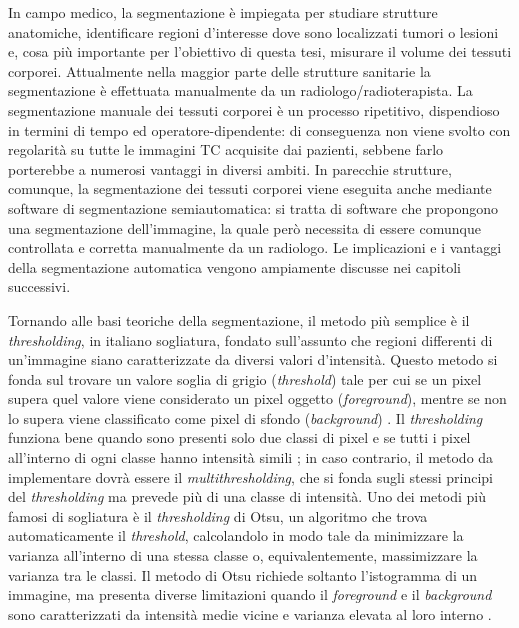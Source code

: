 In campo medico, la segmentazione è impiegata per studiare strutture anatomiche, identificare regioni d’interesse dove sono localizzati tumori o lesioni e, cosa più importante per l’obiettivo di questa tesi, misurare il volume dei tessuti corporei. Attualmente nella maggior parte delle strutture sanitarie la segmentazione è effettuata manualmente da un radiologo/radioterapista. La segmentazione manuale dei tessuti corporei è un processo ripetitivo, dispendioso in termini di tempo ed operatore-dipendente: di conseguenza non viene svolto con regolarità su tutte le immagini TC acquisite dai pazienti, sebbene farlo porterebbe a numerosi vantaggi in diversi ambiti. In parecchie strutture, comunque, la segmentazione dei tessuti corporei viene eseguita anche mediante software di segmentazione semiautomatica: si tratta di software che propongono una segmentazione dell'immagine, la quale però necessita di essere comunque controllata e corretta manualmente da un radiologo. Le implicazioni e i vantaggi della segmentazione automatica vengono ampiamente discusse nei capitoli successivi.

Tornando alle basi teoriche della segmentazione, il metodo più semplice è il \textit{thresholding}, in italiano sogliatura, fondato sull'assunto che regioni differenti di un’immagine siano caratterizzate da diversi valori d’intensità. Questo metodo si fonda sul trovare un valore soglia di grigio (\textit{threshold}) tale per cui se un pixel supera quel valore viene considerato un pixel oggetto (\textit{foreground}), mentre se non lo supera viene classificato come pixel di sfondo (\textit{background}) \cite[743]{gonzalez}. Il \textit{thresholding} funziona bene quando sono presenti solo due classi di pixel e se tutti i pixel all’interno di ogni classe hanno intensità simili \cite[20]{LaRosa}; in caso contrario, il metodo da implementare dovrà essere il \textit{multithresholding}, che si fonda sugli stessi principi del \textit{thresholding} ma prevede più di una classe di intensità. Uno dei metodi più famosi di sogliatura è il \textit{thresholding} di Otsu, un algoritmo che trova automaticamente il \textit{threshold}, calcolandolo in modo tale da minimizzare la varianza all'interno di una stessa classe o, equivalentemente, massimizzare la varianza tra le classi. Il metodo di Otsu richiede soltanto l'istogramma di un immagine, ma presenta diverse limitazioni quando il \textit{foreground} e il \textit{background} sono caratterizzati da intensità medie vicine e varianza elevata al loro interno \cite[20]{LaRosa}.

